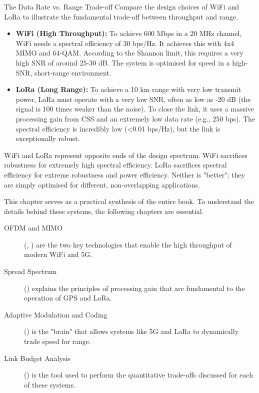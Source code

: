 \begin{workedexample}{The Data Rate vs. Range Trade-off}
     Compare the design choices of WiFi and LoRa to illustrate the fundamental trade-off between throughput and range.
    \begin{itemize}
        \item \textbf{WiFi (High Throughput):} To achieve 600 Mbps in a 20 MHz channel, WiFi needs a spectral efficiency of 30 bps/Hz. It achieves this with 4x4 MIMO and 64-QAM. According to the Shannon limit, this requires a very high SNR of around 25-30 dB. The system is optimised for speed in a high-SNR, short-range environment.
        \item \textbf{LoRa (Long Range):} To achieve a 10 km range with very low transmit power, LoRa must operate with a very low SNR, often as low as -20 dB (the signal is 100 times weaker than the noise). To close the link, it uses a massive processing gain from CSS and an extremely low data rate (e.g., 250 bps). The spectral efficiency is incredibly low (<0.01 bps/Hz), but the link is exceptionally robust.
    \end{itemize}
     WiFi and LoRa represent opposite ends of the design spectrum. WiFi sacrifices robustness for extremely high spectral efficiency. LoRa sacrifices spectral efficiency for extreme robustness and power efficiency. Neither is "better"; they are simply optimised for different, non-overlapping applications.
\end{workedexample}


\begin{importantbox}[title={Further Reading}]
    This chapter serves as a practical synthesis of the entire book. To understand the details behind these systems, the following chapters are essential.
    \begin{description}
        \item[OFDM and MIMO] (, ) are the two key technologies that enable the high throughput of modern WiFi and 5G.
        \item[Spread Spectrum] () explains the principles of processing gain that are fundamental to the operation of GPS and LoRa.
        \item[Adaptive Modulation and Coding] () is the "brain" that allows systems like 5G and LoRa to dynamically trade speed for range.
        \item[Link Budget Analysis] () is the tool used to perform the quantitative trade-offs discussed for each of these systems.
    \end{description}
\end{importantbox}